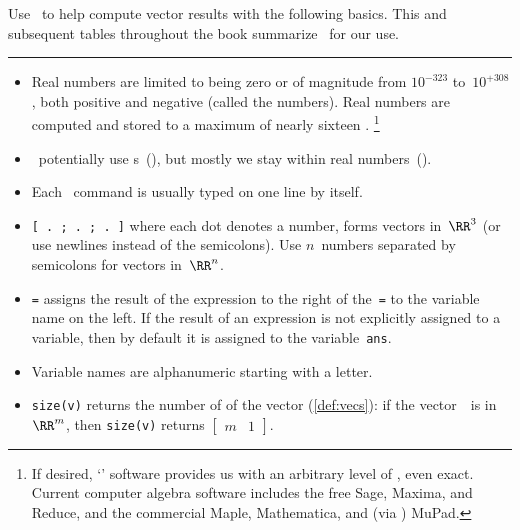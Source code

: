 \begin{table}
\caption{Use \script\ to help compute vector results with the following basics.  
This and subsequent tables throughout the book summarize \script\ for our use.
} \label{tbl:mtlbpre}
\hrule\smallskip
\begin{minipage}{\linewidth}
\begin{itemize}
\item Real numbers are limited to being zero or of magnitude from \(10^{-323}\)  to~\(10^{+308}\), both positive and negative (called the  numbers).
Real numbers are computed and stored to a maximum  of nearly sixteen .%
\footnote{If desired, `' software provides us with an arbitrary level of , even exact.
Current computer algebra software includes the free Sage, Maxima, and Reduce, and the commercial Maple, Mathematica, and (via \script[1]) MuPad.}

\item \script\ potentially use s~(\CC), but mostly we stay within real numbers~(\RR).

\item Each \script\ command is usually typed on one line by itself.

\item {}\verb|[ . ; . ; . ]| where each dot denotes a number, forms vectors in~\(\RR^3\) (or use newlines instead of the semicolons).  
Use \(n\)~numbers separated by semicolons for vectors in~\(\RR^n\).

\item {}\verb|=| assigns the result of the expression to the right of the~\verb|=| to the variable name on the left.
If the result of an expression is not explicitly assigned to a variable, then by default it is assigned to the variable~\verb|ans|.

\item Variable names are alphanumeric starting with a letter.

\item {}\verb|size(v)| returns the number of  of the vector (\cref{def:vecs}): if the vector~\vv\ is in~\(\RR^m\), then \verb|size(v)| returns \(\begin{bmatrix} m&1 \end{bmatrix}\).


\end{itemize}
\end{minipage}
\end{table}
